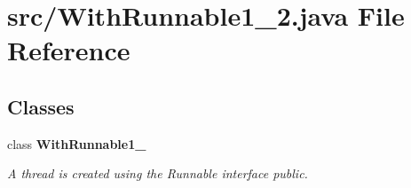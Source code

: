 \section{src/\+With\+Runnable1\+\_\+2.java File Reference}
\label{_with_runnable1__2_8java}
\subsection*{Classes}
\begin{DoxyCompactItemize}
\item 
class {\bf With\+Runnable1\+\_}
\begin{DoxyCompactList}\small\item\em A thread is created using the Runnable interface  public. \end{DoxyCompactList}\end{DoxyCompactItemize}
